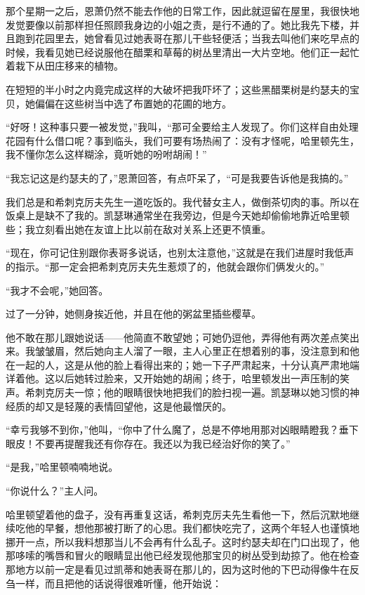 \par 那个星期一之后，恩萧仍然不能去作他的日常工作，因此就逗留在屋里，我很快地发觉要像以前那样担任照顾我身边的小姐之责，是行不通的了。她比我先下楼，并且跑到花园里去，她曾看见过她表哥在那儿干些轻便活；当我去叫他们来吃早点的时候，我看见她已经说服他在醋栗和草莓的树丛里清出一大片空地。他们正一起忙着栽下从田庄移来的植物。
\par 在短短的半小时之内竟完成这样的大破坏把我吓坏了；这些黑醋栗树是约瑟夫的宝贝，她偏偏在这些树当中选了布置她的花圃的地方。
\par “好呀！这种事只要一被发觉，”我叫，“那可全要给主人发现了。你们这样自由处理花园有什么借口呢？事到临头，我们可要有场热闹了：没有才怪呢，哈里顿先生，我不懂你怎么这样糊涂，竟听她的吩咐胡闹！”
\par “我忘记这是约瑟夫的了，”恩萧回答，有点吓呆了，“可是我要告诉他是我搞的。”
\par 我们总是和希刺克厉夫先生一道吃饭的。我代替女主人，做倒茶切肉的事。所以在饭桌上是缺不了我的。凯瑟琳通常坐在我旁边，但是今天她却偷偷地靠近哈里顿些；我立刻看出她在友谊上比以前在敌对关系上还更不慎重。
\par “现在，你可记住别跟你表哥多说话，也别太注意他，”这就是在我们进屋时我低声的指示。“那一定会把希刺克厉夫先生惹烦了的，他就会跟你们俩发火的。”
\par “我才不会呢，”她回答。
\par 过了一分钟，她侧身挨近他，并且在他的粥盆里插些樱草。
\par 他不敢在那儿跟她说话——他简直不敢望她；可她仍逗他，弄得他有两次差点笑出来。我皱皱眉，然后她向主人溜了一眼，主人心里正在想着别的事，没注意到和他在一起的人，这是从他的脸上看得出来的；她一下子严肃起来，十分认真严肃地端详着他。这以后她转过脸来，又开始她的胡闹；终于，哈里顿发出一声压制的笑声。希刺克厉夫一惊；他的眼睛很快地把我们的脸扫视一遍。凯瑟琳以她习惯的神经质的却又是轻蔑的表情回望他，这是他最憎厌的。
\par “幸亏我够不到你，”他叫，“你中了什么魔了，总是不停地用那对凶眼睛瞪我？垂下眼皮！不要再提醒我还有你存在。我还以为我已经治好你的笑了。”
\par “是我，”哈里顿喃喃地说。
\par “你说什么？”主人问。
\par 哈里顿望着他的盘子，没有再重复这话，希刺克厉夫先生看他一下，然后沉默地继续吃他的早餐，想他那被打断了的心思。我们都快吃完了，这两个年轻人也谨慎地挪开一点，所以我料想那当儿不会再有什么乱子。这时约瑟夫却在门口出现了，他那哆嗦的嘴唇和冒火的眼睛显出他已经发现他那宝贝的树丛受到劫掠了。他在检查那地方以前一定是看见过凯蒂和她表哥在那儿的，因为这时他的下巴动得像牛在反刍一样，而且把他的话说得很难听懂，他开始说：
